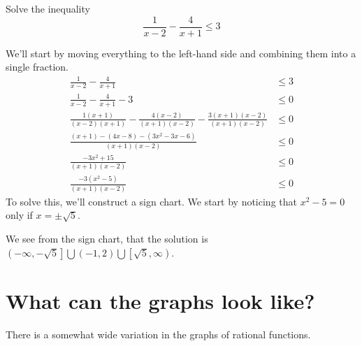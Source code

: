 \documentclass{ximera}
\begin{document}
\begin{example}
	Solve the inequality
	\[ \frac{1}{x-2} - \frac{4}{x+1} \leq 3 \]
	\begin{explanation}
		We'll start by moving everything to the left-hand side and combining them into a single fraction.
		\begin{align*}
			\frac{1}{x-2} - \frac{4}{x+1} &\leq 3 \\
			\frac{1}{x-2} - \frac{4}{x+1} - 3 &\leq 0\\
			\frac{1(x+1)}{(x-2)(x+1)} - \frac{4(x-2)}{(x+1)(x-2)} - \frac{3(x+1)(x-2)}{(x+1)(x-2)} &\leq 0\\
			\frac{(x+1) - (4x-8) - (3x^2-3x-6)}{(x+1)(x-2)} &\leq 0\\
			\frac{-3x^2+15}{(x+1)(x-2)} &\leq 0\\
			\frac{-3(x^2-5)}{(x+1)(x-2)} &\leq 0
		\end{align*}
		To solve this, we'll construct a sign chart.  We start by noticing that $x^2-5 =0$ only if $x = \pm \sqrt{5}$.
		
		We see from the sign chart, that the solution is $\displaystyle \left( -\infty, -\sqrt{5} \right] \bigcup \left(-1, 2\right) \bigcup \left[ \sqrt{5}, \infty \right)$.
	\end{explanation}
\end{example}







\section{What can the graphs look like?}

There is a somewhat wide variation in the graphs of rational
functions.
\end{document}
